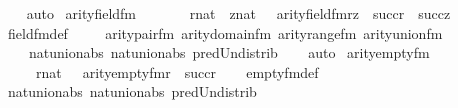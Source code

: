\begin{isabellebody}
\ \ \isamarkupfalse%
\ auto%
\endisatagproof
{\isafoldproof}%
%
\isadelimproof
\isanewline
%
\endisadelimproof
\isanewline
{}\isamarkupfalse%
\ arity{\isacharunderscore}{\kern0pt}field{\isacharunderscore}{\kern0pt}fm\ {\isacharcolon}{\kern0pt}\ \isanewline
\ \ \ \ {\isachardoublequoteopen}{\isasymlbrakk}\ r{\isasymin}nat\ {\isacharsemicolon}{\kern0pt}\ z{\isasymin}nat\ {\isasymrbrakk}\ {\isasymLongrightarrow}\ arity{\isacharparenleft}{\kern0pt}field{\isacharunderscore}{\kern0pt}fm{\isacharparenleft}{\kern0pt}r{\isacharcomma}{\kern0pt}z{\isacharparenright}{\kern0pt}{\isacharparenright}{\kern0pt}\ {\isacharequal}{\kern0pt}\ succ{\isacharparenleft}{\kern0pt}r{\isacharparenright}{\kern0pt}\ {\isasymunion}\ succ{\isacharparenleft}{\kern0pt}z{\isacharparenright}{\kern0pt}{\isachardoublequoteclose}\isanewline
%
\isadelimproof
\ \ %
\endisadelimproof
%
\isatagproof
{}\isamarkupfalse%
\ field{\isacharunderscore}{\kern0pt}fm{\isacharunderscore}{\kern0pt}def\ \isanewline
\ \ \isamarkupfalse%
\ arity{\isacharunderscore}{\kern0pt}pair{\isacharunderscore}{\kern0pt}fm\ arity{\isacharunderscore}{\kern0pt}domain{\isacharunderscore}{\kern0pt}fm\ arity{\isacharunderscore}{\kern0pt}range{\isacharunderscore}{\kern0pt}fm\ arity{\isacharunderscore}{\kern0pt}union{\isacharunderscore}{\kern0pt}fm\ \isanewline
\ \ \ \ nat{\isacharunderscore}{\kern0pt}union{\isacharunderscore}{\kern0pt}abs{}\ nat{\isacharunderscore}{\kern0pt}union{\isacharunderscore}{\kern0pt}abs{}\ pred{\isacharunderscore}{\kern0pt}Un{\isacharunderscore}{\kern0pt}distrib\isanewline
\ \ \isamarkupfalse%
\ auto%
\endisatagproof
{\isafoldproof}%
%
\isadelimproof
\isanewline
%
\endisadelimproof
\isanewline
{}\isamarkupfalse%
\ arity{\isacharunderscore}{\kern0pt}empty{\isacharunderscore}{\kern0pt}fm\ {\isacharcolon}{\kern0pt}\ \isanewline
\ \ \ \ {\isachardoublequoteopen}{\isasymlbrakk}\ r{\isasymin}nat\ {\isasymrbrakk}\ {\isasymLongrightarrow}\ arity{\isacharparenleft}{\kern0pt}empty{\isacharunderscore}{\kern0pt}fm{\isacharparenleft}{\kern0pt}r{\isacharparenright}{\kern0pt}{\isacharparenright}{\kern0pt}\ {\isacharequal}{\kern0pt}\ succ{\isacharparenleft}{\kern0pt}r{\isacharparenright}{\kern0pt}{\isachardoublequoteclose}\isanewline
%
\isadelimproof
\ \ %
\endisadelimproof
%
\isatagproof
{}\isamarkupfalse%
\ empty{\isacharunderscore}{\kern0pt}fm{\isacharunderscore}{\kern0pt}def\ \isanewline
\ \ \isamarkupfalse%
\ nat{\isacharunderscore}{\kern0pt}union{\isacharunderscore}{\kern0pt}abs{}\ nat{\isacharunderscore}{\kern0pt}union{\isacharunderscore}{\kern0pt}abs{}\ pred{\isacharunderscore}{\kern0pt}Un{\isacharunderscore}{\kern0pt}distrib\isanewline

\end{isabellebody}

